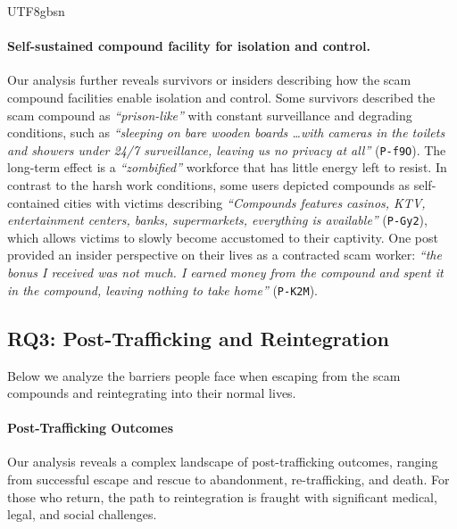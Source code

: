 \documentclass[sigconf,nonacm]{acmart}
\newcommand{\rev}[1]{#1}
\begin{document}
\begin{CJK}{UTF8}{gbsn}
\paragraph{\textbf{Self-sustained compound facility for isolation and control.}} \rev{Our analysis further reveals survivors or insiders describing how the scam compound facilities enable isolation and control. Some survivors described the scam compound as \textit{``prison-like''} with constant surveillance and degrading conditions, such as \textit{``sleeping on bare wooden boards \dots with cameras in the toilets and showers under 24/7 surveillance, leaving us no privacy at all''} (\texttt{P-f9O}). The long-term effect is a \textit{``zombified''} workforce that has little energy left to resist. In contrast to the harsh work conditions, some users depicted compounds as self-contained cities with victims describing \textit{``Compounds features casinos, KTV, entertainment centers, banks, supermarkets, everything is available''} (\texttt{P-Gy2}),} which allows victims to slowly become accustomed to their captivity. One post provided an insider perspective on their lives as a contracted scam worker: \textit{``the bonus I received was not much. I earned money from the compound and spent it in the compound, leaving nothing to take home''} (\texttt{P-K2M}).

\subsection{RQ3: Post-Trafficking and Reintegration}
\label{sec:RQ3}

Below we analyze the barriers people face when escaping from the scam compounds and reintegrating into their normal lives. 

\paragraph{Post-Trafficking Outcomes}
\label{sec:post_trafficking_outcomes}
Our analysis reveals a complex  landscape of post-trafficking outcomes, ranging from successful escape and rescue to abandonment, re-trafficking, and death. For those who return, the path to reintegration is fraught with significant medical, legal, and social challenges.


\end{CJK}
\end{document}
